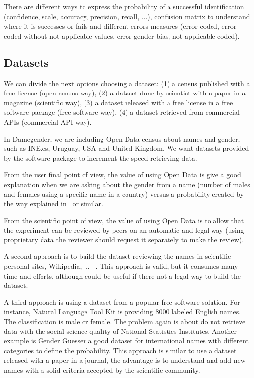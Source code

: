 \documentclass[a4paper]{article}
\begin{document}
There are different ways to express the probability of a successful identification (confidence, scale, accuracy, precision, recall, ...), confusion matrix to understand where it is successes or fails and different errors measures (error coded, error coded without not applicable values, error gender bias, not applicable coded).

\subsection{Datasets}

We can divide the next options choosing a dataset: (1) a census published with a free license (open census way), (2) a dataset done by scientist with a paper in a magazine (scientific way), (3) a dataset released with a free license in a free software package (free software way), (4) a dataset retrieved from commercial APIs (commercial API way).

In Damegender, we are including Open Data census about names and gender, such as INE.es, Uruguay, USA and United Kingdom. We want datasets provided by the software package to increment the speed retrieving data.

From the user final point of view, the value of using Open Data is give a good explanation when we are asking about the gender from a name (number of males and females using a specific name in a country) versus a probability created by the way explained in~\cite{10.7717/peerj-cs.156} or similar.

From the scientific point of view, the value of using Open Data is to allow that the experiment can be reviewed by peers on an automatic and legal way (using proprietary data the reviewer should request it separately to make the review).

A second approach is to build the dataset reviewing the names in scientific personal sites, Wikipedia, ... ~\cite{10.7717/peerj-cs.156}. 
This approach is valid, but it consumes many time and efforts, although could be useful if there not a legal way to build the dataset.

A third approach is using a dataset from a popular free software solution. For instance, Natural Language Tool Kit is providing 8000 labeled English names. 
The classification is male or female. The problem again is about do not retrieve data with the social science quality of National Statistics Institutes. 
Another example is Gender Guesser a good dataset for international names with different categories to define the probability. 
This approach is similar to use a dataset released with a paper in a journal, the advantage is to understand and add new names with a solid criteria accepted by the scientific community.
\end{document}
